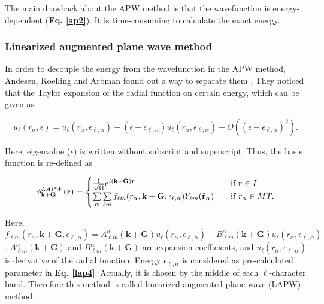 \documentclass[a4paper, 12pt, titlepage,oneside,drop]{kthesis}
\begin{document}
The main drawback about the APW method is that the wavefunction is energy-dependent (\textbf{Eq. \ref{ap2}}). It is time-consuming to calculate the exact energy.

\subsubsection{Linearized augmented plane wave method}
\noindent In order to decouple the energy from the wavefunction in the APW method, Andesen, Koelling and Arbman found out a way to separate them \cite{andersen1975linear, koelling1975use}. They noticed that the Taylor expansion of the radial function
on certain energy, which can be given as

\begin{equation}\label{ap3}
 u_{{\ell}}(r_{\alpha}, \epsilon) = u_{{\ell}}(r_{\alpha}, \epsilon_{\ell,\alpha}) + (\epsilon-\epsilon_{\ell,\alpha}) \dot{u}_{{\ell}}(r_{\alpha}, \epsilon_{\ell,\alpha}) + O((\epsilon-\epsilon_{\ell,\alpha})^2).
\end{equation}

Here, eigenvalue ($\epsilon$) is written without subscript and superscript. Thus, the basis function is re-defined as 

\begin{equation}\label{lap4}
\phi^{LAPW}_{\textbf{k}+\textbf{G}} (\textbf{r}) = 
\begin{cases} \frac {1}{\sqrt{\Omega}} e^{i(\textbf{k}+\textbf{G})\textbf{r}} & \quad \mbox{if $\textbf{r} \in {I} $}
\\
\sumg<\alpha>\sum\limits_{{\ell}m} f_{{\ell}{m}} (r_{\alpha},\textbf{k}+\textbf{G}, \epsilon_{\ell,\alpha}) Y_{{\ell}m}(\hat{\textbf{r}}_{\alpha})  & \quad \mbox{if $r_{\alpha} \in MT. $}\\ 
\end{cases}
\end{equation}

Here, $f_{{\ell}{m}} (r_{\alpha},\textbf{k}+\textbf{G}, \epsilon_{\ell,\alpha}) =  A _{{\ell}m}^{\alpha} (\textbf {k}+\textbf{G}) u_{{\ell}}(r_{\alpha}, \epsilon_{\ell,\alpha}) + B _{{\ell}m}^{\alpha} (\textbf {k}+\textbf{G}) \dot{u}_{{\ell}}(r_{\alpha}, \epsilon_{\ell,\alpha})$
. $A _{{\ell}m}^{\alpha} (\textbf {k}+\textbf{G})$ and $B _{{\ell}m}^{\alpha} (\textbf {k}+\textbf{G})$ are expansion coefficients, and $\dot{u}_{{\ell}}(r_{\alpha}, \epsilon_{\ell,\alpha} )$ is derivative of the radial 
function. Energy $\epsilon_{\ell,\alpha}$  is considered as pre-calculated parameter in \textbf{Eq. \ref{lap4}}. Actually, it is chosen by the middle of  each $\ell$-character band. Therefore this method is called linearized
augmented plane wave (LAPW) method.
\end{document}
